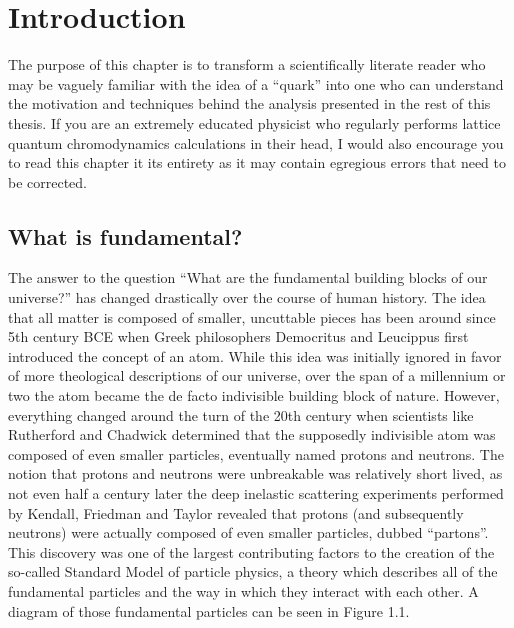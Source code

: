 \chapter{Introduction}

The purpose of this chapter is to transform a scientifically literate reader who may be vaguely familiar with the idea of a ``quark'' into one who can understand the motivation and techniques behind the analysis presented in the rest of this thesis. 
If you are an extremely educated physicist who regularly performs lattice quantum chromodynamics calculations in their head, I would also encourage you to read this chapter it its entirety as it may contain egregious errors that need to be corrected. 

\section{What is fundamental?}
The answer to the question ``What are the fundamental building blocks of our universe?'' has changed drastically over the course of human history.
The idea that all matter is composed of smaller, uncuttable pieces has been around since 5th century BCE when Greek philosophers Democritus and Leucippus first introduced the concept of an atom\cite{}. 
While this idea was initially ignored in favor of more theological descriptions of our universe, over the span of a millennium or two the atom became the de facto indivisible building block of nature. 
However, everything changed around the turn of the 20th century when scientists like Rutherford and Chadwick determined that the supposedly indivisible atom was composed of even smaller particles, eventually named protons and neutrons. 
The notion that protons and neutrons were unbreakable was relatively short lived, as not even half a century later the deep inelastic scattering experiments performed by Kendall, Friedman and Taylor revealed that protons (and subsequently neutrons) were actually composed of even smaller particles, dubbed ``partons''. \cite{}
This discovery was one of the largest contributing factors to the creation of the so-called Standard Model of particle physics, a theory which describes all of the fundamental particles and the way in which they interact with each other. A diagram of those fundamental particles can be seen in Figure 1.1.
